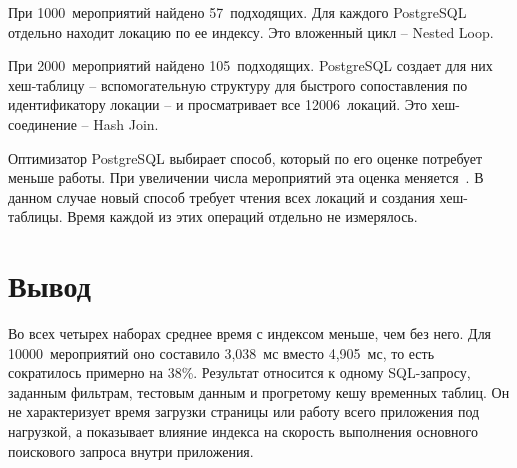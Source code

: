 При 1000~мероприятий найдено 57~подходящих. Для каждого PostgreSQL отдельно находит локацию по ее индексу. Это вложенный цикл -- Nested Loop.

При 2000~мероприятий найдено 105~подходящих. PostgreSQL создает для них хеш-таблицу -- вспомогательную структуру для быстрого сопоставления по идентификатору локации -- и просматривает все 12006~локаций. Это хеш-соединение -- Hash Join.

Оптимизатор PostgreSQL выбирает способ, который по его оценке потребует меньше работы. При увеличении числа мероприятий эта оценка меняется~\cite{postgresql-explain}. В данном случае новый способ требует чтения всех локаций и создания хеш-таблицы. Время каждой из этих операций отдельно не измерялось.

\section{Вывод}

Во всех четырех наборах среднее время с индексом меньше, чем без него. Для 10000~мероприятий оно составило 3,038~мс вместо 4,905~мс, то есть сократилось примерно на 38\%. Результат относится к одному SQL-запросу, заданным фильтрам, тестовым данным и прогретому кешу временных таблиц. Он не характеризует время загрузки страницы или работу
всего приложения под нагрузкой, а показывает влияние индекса на скорость выполнения основного поискового запроса внутри приложения.
